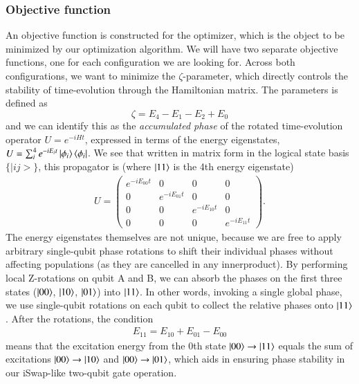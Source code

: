 \documentclass{subfiles}
\begin{document}
\subsubsection{Objective function}
An objective function is constructed for the optimizer, which is the object to be minimized by our optimization algorithm. We will have two separate objective functions, one for each configuration we are looking for. Across both configurations, we want to minimize the $\zeta$-parameter, which directly controls the stability of time-evolution through the Hamiltonian matrix. The parameters is defined as 
\begin{equation*}
    \zeta = E_4 - E_1 - E_2 + E_0
\end{equation*}
and we can identify this as the \emph{accumulated phase} of the rotated time-evolution operator $U = e^{-iHt}$, expressed in terms of the energy eigenstates, $U = \sum_i^4 e^{-iE_it}\ket{\phi_i}\bra{\phi_i}$. We see that written in matrix form in the logical state basis $\{|ij>\}$, this propagator is (where $\ket{11}$ is the 4th energy eigenstate)
\begin{align*}
    U = \begin{pmatrix}
        e^{-iE_{00}t} & 0 & 0 & 0 \\
        0 & e^{-iE_{01}t} & 0 & 0 \\
        0 & 0 & e^{-iE_{10}t} & 0 \\
        0 & 0 & 0 & e^{-iE_{11}t}
    \end{pmatrix}.
\end{align*}
The energy eigenstates themselves are not unique, because we are free to apply arbitrary single-qubit phase rotations to shift their individual phases without affecting populations (as they are cancelled in any innerproduct). By performing local Z-rotations on qubit A and B, we can absorb the phases on the first three states ($\ket{00}$, $\ket{10}$, $\ket{01}$) into $\ket{11}$. In other words, invoking a single global phase, we use single-qubit rotations on each qubit to collect the relative phases onto $\ket{11}$. After the rotations, the condition
\begin{align*}
    E_{11} = E_{10} + E_{01} - E_00
\end{align*}
means that the excitation energy from the 0th state $\ket{00}\to\ket{11}$ equals the sum of excitations $\ket{00}\to\ket{10}$ and $\ket{00}\to\ket{01}$, which aids in ensuring phase stability in our iSwap-like two-qubit gate operation. 
\\\\
\end{document}
